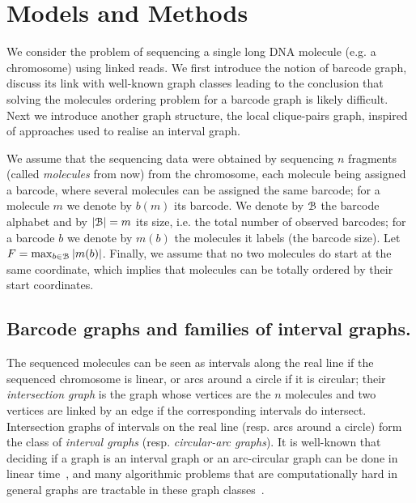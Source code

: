 \section{Models and Methods}
\label{sec:methods}

We consider the problem of sequencing a single long DNA molecule (e.g. a chromosome) using linked reads. 
We first introduce the notion of barcode graph, discuss its link with well-known graph classes leading to the conclusion that solving the molecules ordering problem for a barcode graph is likely difficult. 
Next we introduce another graph structure, the local clique-pairs graph, inspired of approaches used to realise an interval graph.

We assume that the sequencing data were obtained by sequencing $n$ fragments (called \textit{molecules} from now) from the chromosome, each molecule being assigned a barcode, where several molecules can be assigned the same barcode; for a molecule $m$ we denote by $b(m)$ its barcode.
We denote by ${\cal B}{}$ the barcode alphabet and by $|{\cal B}|=m$ its size, i.e. the total number of observed barcodes; for a barcode $b$ we denote by $m(b)$ the molecules it labels (the barcode size). Let $F = \max_{b\in {\cal B}} |m(b)|$.
Finally, we assume that no two molecules do start at the same coordinate, which implies that molecules can be totally ordered by their start coordinates.

\subsection{Barcode graphs and families of interval graphs. \label{sec:interval_graph}}
\label{ssec:barcode_graphs}

The sequenced molecules can be seen as intervals along the real line if the sequenced chromosome is linear, or arcs around a circle if it is circular; their \textit{intersection graph} is the graph whose vertices are the $n$ molecules and two vertices are linked by an edge if the corresponding intervals do intersect. 
Intersection graphs of intervals on the real line (resp. arcs around a circle) form the class of \textit{interval graphs} (resp. \textit{circular-arc graphs}).
It is well-known that deciding if a graph is an interval graph or an arc-circular graph can be done in linear time~\cite{BoothL_1976,McConnell_2003}, and many algorithmic problems that are computationally hard in general graphs are tractable in these graph classes~\cite{Golumbic_2004}.


